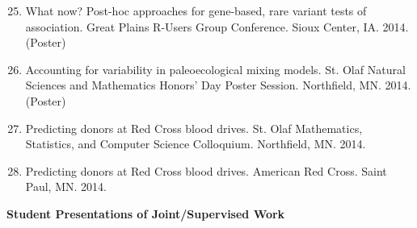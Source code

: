 \documentclass[margin]{res}
\newenvironment{benumerate}[1]{
    \let\oldItem\item
    \def\item{\addtocounter{enumi}{-2}\oldItem}
    
    \begin{enumerate}
    \setcounter{enumi}{#1}
    \addtocounter{enumi}{1}
}{
    \end{enumerate}
}
\begin{document}
\begin{resume}
\begin{benumerate}{24}

\item %
What now? Post-hoc approaches for gene-based, rare variant tests of association. Great Plains R-Users Group Conference. Sioux Center, IA. 2014. (Poster)

\item %
Accounting for variability in paleoecological mixing models. St. Olaf Natural Sciences and Mathematics Honors’ Day Poster Session. Northfield, MN. 2014. (Poster)


\item %
Predicting donors at Red Cross blood drives. St. Olaf Mathematics, Statistics, and Computer Science Colloquium. Northfield, MN. 2014.

\item %
Predicting donors at Red Cross blood drives. American Red Cross. Saint Paul, MN. 2014.%


\end{benumerate}



\textbf{Student Presentations of Joint/Supervised Work}

\begin{itemize}


\end{itemize}
\end{resume}
\end{document}
